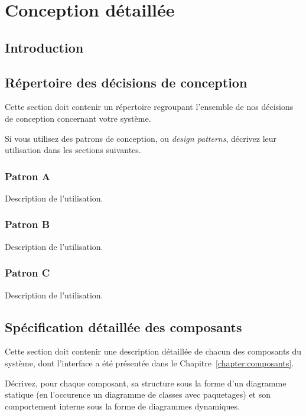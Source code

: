 
\chapter{Conception détaillée}

\section{Introduction}

\section{Répertoire des décisions de conception}

Cette section doit contenir un répertoire regroupant l'ensemble de nos décisions de conception concernant votre système.

Si vous utilisez des patrons de conception, ou \emph{design patterns}, décrivez leur utilisation dans les sections suivantes.

\subsection{Patron A}
Description de l'utilisation.

\subsection{Patron B}
Description de l'utilisation.

\subsection{Patron C}
Description de l'utilisation.





\section{Spécification détaillée des composants}
Cette section doit contenir une description détaillée de chacun des composants du système, dont l'interface a été présentée dans le Chapitre~\ref{chapter:composants}.

Décrivez, pour chaque composant, sa structure sous la forme d'un diagramme statique (en l'occurence un diagramme de classes avec paquetages) et son comportement interne sous la forme de diagrammes dynamiques. 

